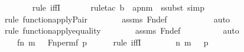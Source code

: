 \begin{isabellebody}
\ \ \ \ \ \ \isamarkupfalse%
{\isacharparenleft}{\kern0pt}rule\ iffI{\isacharparenright}{\kern0pt}\isanewline
\ \ \ \ \ \ \isamarkupfalse%
{\isacharparenleft}{\kern0pt}rule{\isacharunderscore}{\kern0pt}tac\ b{\isacharequal}{\kern0pt}{}\ \ a{\isacharequal}{\kern0pt}{\isachardoublequoteopen}p{\isacharbackquote}{\kern0pt}{\isacharless}{\kern0pt}n{\isacharcomma}{\kern0pt}m{\isachargreater}{\kern0pt}{\isachardoublequoteclose}\ \ ssubst{\isacharcomma}{\kern0pt}\ simp{\isacharparenright}{\kern0pt}\isanewline
\ \ \ \ \ \ \ \isamarkupfalse%
{\isacharparenleft}{\kern0pt}rule\ function{\isacharunderscore}{\kern0pt}apply{\isacharunderscore}{\kern0pt}Pair{\isacharparenright}{\kern0pt}\isanewline
\ \ \ \ \ \ \isamarkupfalse%
\ assms{}\ Fn{\isacharunderscore}{\kern0pt}def\ \isanewline
\ \ \ \ \ \ \ \ \isamarkupfalse%
\ auto{\isacharbrackleft}{\kern0pt}{}{\isacharbrackright}{\kern0pt}\isanewline
\ \ \ \ \ \ \isamarkupfalse%
{\isacharparenleft}{\kern0pt}rule\ function{\isacharunderscore}{\kern0pt}apply{\isacharunderscore}{\kern0pt}equality{\isacharparenright}{\kern0pt}\isanewline
\ \ \ \ \ \ \isamarkupfalse%
\ assms{}\ Fn{\isacharunderscore}{\kern0pt}def\ \isanewline
\ \ \ \ \ \ \ \isamarkupfalse%
\ auto{\isacharbrackleft}{\kern0pt}{}{\isacharbrackright}{\kern0pt}\isanewline
\ \ \ \ \ \ \isamarkupfalse%
\isanewline
\ \ \ \ \isamarkupfalse%
\ \isamarkupfalse%
\ {\isachardoublequoteopen}{\isachardot}{\kern0pt}{\isachardot}{\kern0pt}{\isachardot}{\kern0pt}\ {\isasymlongleftrightarrow}\ {\isacharless}{\kern0pt}{\isacharless}{\kern0pt}f{\isacharbackquote}{\kern0pt}n{\isacharcomma}{\kern0pt}\ m{\isachargreater}{\kern0pt}{\isacharcomma}{\kern0pt}\ {}{\isachargreater}{\kern0pt}\ {\isasymin}\ Fn{\isacharunderscore}{\kern0pt}perm{\isacharparenleft}{\kern0pt}f{\isacharcomma}{\kern0pt}\ p{\isacharparenright}{\kern0pt}{\isachardoublequoteclose}\ \isanewline
\ \ \ \ \isamarkupfalse%
{\isacharparenleft}{\kern0pt}rule\ iffI{\isacharparenright}{\kern0pt}\isanewline
\ \ \ \ \ \ \isamarkupfalse%
\ {\isachardoublequoteopen}{\isasymlangle}{\isasymlangle}n{\isacharcomma}{\kern0pt}\ m{\isasymrangle}{\isacharcomma}{\kern0pt}\ {}{\isasymrangle}\ {\isasymin}\ p{\isachardoublequoteclose}\ \isanewline
\ \ \ \ \ \ \isamarkupfalse%
\ \isamarkupfalse%

\end{isabellebody}
